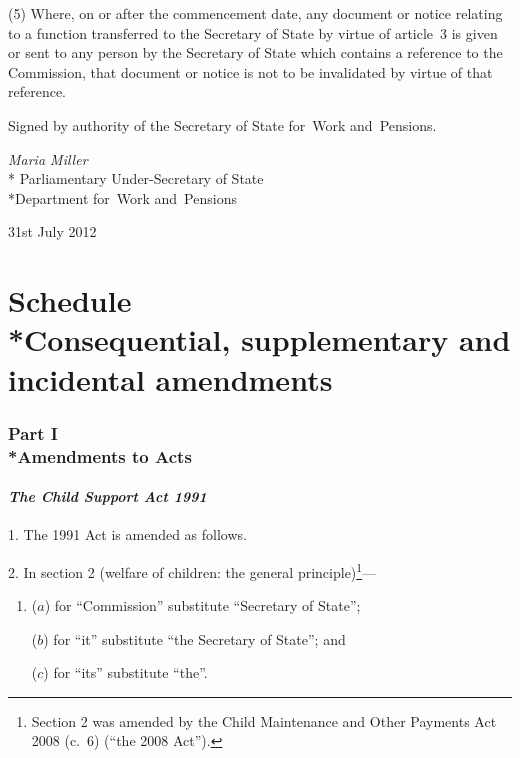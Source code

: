 \documentclass[12pt,a4paper]{article}
\begin{document}
(5) Where, on or after the commencement date, any document or notice relating to a function transferred to the Secretary of State by virtue of article~3 is given or sent to any person by the Secretary of State which contains a reference to the Commission, that document or notice is not to be invalidated by virtue of that reference. 

\bigskip

\pagebreak[3]

Signed 
by authority of the 
Secretary of State for~Work and~Pensions.

{\raggedleft
\emph{Maria Miller}\\*
Parliamentary Under-Secretary 
of State\\*Department 
for~Work and~Pensions

}

31st July 2012

\small

\part[Schedule --- Consequential, supplementary and incidental amendments]{Schedule\\*Consequential, supplementary and incidental amendments}

\section[Part I --- Amendments to Acts]{Part I\\*Amendments to Acts}

\renewcommand\parthead{--- Schedule Part I}

\subsection*{\itshape The Child Support Act 1991}

1.  The 1991 Act is amended as follows.

\medskip

2.  In section 2 (welfare of children: the general principle)\footnote{Section 2 was amended by the Child Maintenance and Other Payments Act 2008 (c.~6) (“the 2008 Act”).}—
\begin{enumerate}\item[]
($a$) for “Commission” substitute “Secretary of State”;

($b$) for “it” substitute “the Secretary of State”; and

($c$) for “its” substitute “the”.
\end{enumerate}
\end{document}
